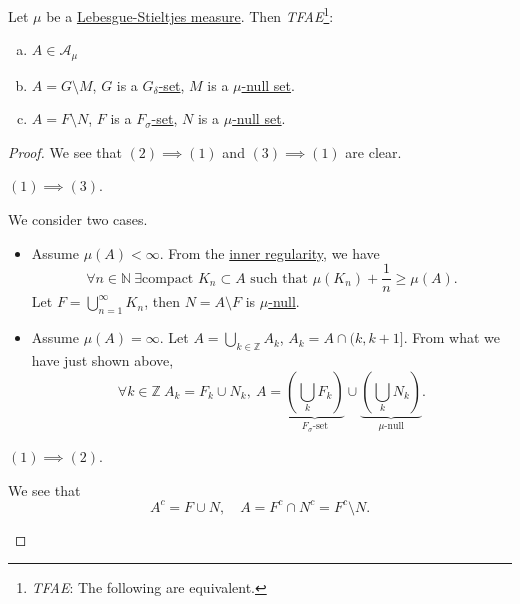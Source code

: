 \begin{theorem}
	Let \(\mu \) be a \hyperref[def:Lebesgue-Stieltjes-measure]{Lebesgue-Stieltjes measure}. Then \emph{TFAE}\footnote{\emph{TFAE}: The following are equivalent.}:
	\begin{enumerate}[(a)]
		\item \(A\in \mathcal{A} _\mu \)
		\item \(A = G\setminus M\), \(G\) is a \hyperref[def:G-delta-set]{\(G_{\delta}\)-set}, \(M\) is a \hyperref[def:mu-null-set]{\(\mu\)-null set}.
		\item \(A = F\setminus N\), \(F\) is a \hyperref[def:F-sigma-set]{\(F_{\sigma}\)-set}, \(N\) is a \hyperref[def:mu-null-set]{\(\mu\)-null set}.
	\end{enumerate}
\end{theorem}
\begin{proof}
	We see that \((2) \implies (1)\) and \((3)\implies (1)\) are clear.
	\begin{claim}
		\((1)\implies (3)\).
	\end{claim}
	\begin{explanation}
		We consider two cases.
		\begin{itemize}
			\item Assume \(\mu (A)<\infty \). From the \hyperref[thm:inner-regularity]{inner regularity}, we have
			      \[
				      \forall n\in\mathbb{N} \ \exists \text{compact }K_{n}\subset A\text{ such that } \mu (K_{n}) + \frac{1}{n} \geq \mu (A).
			      \]
			      Let \(F = \bigcup_{n=1}^{\infty} K_{n}\), then \(N = A\setminus F\) is \hyperref[def:mu-null-set]{\(\mu\)-null}.
			\item Assume \(\mu (A) = \infty \). Let \(A = \bigcup_{k\in\mathbb{Z} } A_{k}\), \(A_{k} = A\cap (k, k+1]\). From what we
			      have just shown above,
			      \[
				      \forall k\in\mathbb{Z}\ A_{k} = F_{k}\cup N_{k},\ A = \underbrace{\left(\bigcup_{k}F_{k} \right)}_{\hyperref[def:F-sigma-set]{F_{\sigma}\text{-set}}}\cup \underbrace{\left(\bigcup_{k}N_{k}\right)}_{\hyperref[def:mu-null-set]{\mu\text{-null}}}.
			      \]
		\end{itemize}
	\end{explanation}
	\begin{claim}
		\((1)\implies (2)\).
	\end{claim}
	\begin{explanation}
		We see that
		\[
			A^{c} = F\cup N,\quad A = F^{c} \cap N^{c} = F^{c} \setminus N.
		\]
	\end{explanation}
\end{proof}


